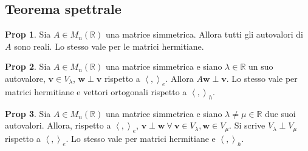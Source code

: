 \documentclass[]{article}
\newcommand{\vv}{\mathbf{v}}
\newcommand{\vw}{\mathbf{w}}
\newcommand{\scalprod}[2]{\left\langle #1 , #2 \right\rangle}
\theoremstyle{definition}
\theoremstyle{definition}
\newtheorem{prop}{Prop}[subsection]
\theoremstyle{definition}
\begin{document}
\subsection{Teorema spettrale} 

\begin{prop} Sia $A \in M_n (\mathbb{R})$ una matrice simmetrica. Allora tutti gli autovalori di $A$ sono reali. Lo stesso vale per le matrici hermitiane.

\end{prop} \begin{prop} Sia $A \in M_n (\mathbb{R})$ una matrice simmetrica e siano $\lambda \in \mathbb{R}$ un suo autovalore, $\vv \in V_{\lambda}$, $\vw \perp \vv$ rispetto a $\scalprod{}{}_e$. Allora $A \vw \perp \vv$. Lo stesso vale per matrici hermitiane e vettori ortogonali rispetto a $\scalprod{}{}_h$.

\end{prop} \begin{prop} Sia $A \in M_n (\mathbb{R})$ una matrice simmetrica e siano $\lambda \neq \mu \in \mathbb{R}$ due suoi autovalori. Allora, rispetto a $\scalprod{}{}_e$, $\vv \perp \vw \ \forall \ \vv \in V_{\lambda}, \vw \in V_{\mu}$. Si scrive $V_{\lambda} \perp V_{\mu}$ rispetto a $\scalprod{}{}_e$. Lo stesso vale per matrici hermitiane e $\scalprod{}{}_h$.

\end{prop} 
\end{document}
